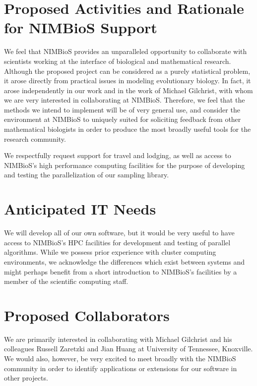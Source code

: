 \documentclass{article}
\begin{document}
\section{Proposed Activities and Rationale for NIMBioS Support}
We feel that NIMBioS provides an unparalleled opportunity to
collaborate with scientists working at the interface of biological and
mathematical research.  Although the proposed project can be
considered as a purely statistical problem, it arose directly from
practical issues in modeling evolutionary biology.  In fact, it arose
independently in our work and in the work of Michael Gilchrist, with
whom we are very interested in collaborating at NIMBioS.  Therefore,
we feel that the methods we intend to implement will be of very
general use, and consider the environment at NIMBioS to uniquely
suited for soliciting feedback from other mathematical biologists in
order to produce the most broadly useful tools for the research
community.

We respectfully request support for travel and lodging, as well as
access to NIMBioS's high performance computing facilities for the
purpose of developing and testing the parallelization of our sampling
library.



\section{Anticipated IT Needs} 

We will develop all of our own software, but it would be very useful
to have access to NIMBioS's HPC facilities for development and testing
of parallel algorithms.  While we possess prior experience with
cluster computing environments, we acknowledge the differences which
exist between systems and might perhaps benefit from a short
introduction to NIMBioS's facilities by a member of the scientific
computing staff.

\section{Proposed Collaborators} 
We are primarily interested in collaborating with Michael Gilchrist
and his colleagues Russell Zaretzki and Jian Huang at University of
Tennessee, Knoxville.  We would also, however, be very excited to meet
broadly with the NIMBioS community in order to identify applications
or extensions for our software in other projects.
\end{document}
